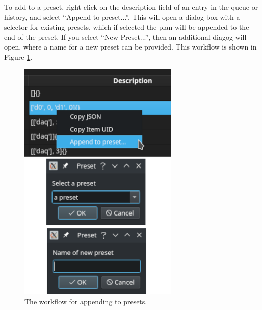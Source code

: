 To add to a preset, right click on the description field of an entry in the queue or history, and select ``Append to preset...''.
This will open a dialog box with a selector for existing presets, which if selected the plan will be appended to the end of the preset.
If you select ``New Preset...'', then an additional diagog will open, where a name for a new preset can be provided.
This workflow is shown in Figure \ref{acq:fig:preset_add}.

\begin{figure}
\includegraphics[width=3in]{"acquisition/images/append_to_preset"}
\caption[Preset add]{
	The workflow for appending to presets.
}
\label{acq:fig:preset_add}
\end{figure}

